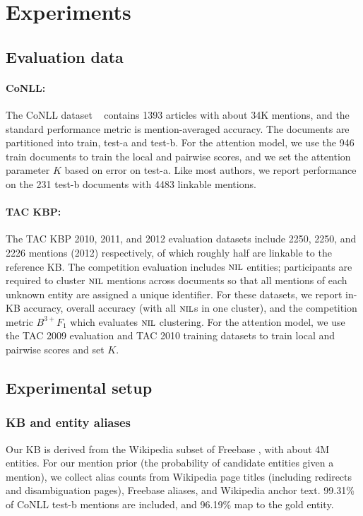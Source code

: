 \section{Experiments}
\label{sec:expt}

\subsection{Evaluation data}

\paragraph*{CoNLL:} 
The CoNLL dataset ~\cite{Hoffart2011} contains 1393 articles with
about 34K mentions, and the standard performance metric is
mention-averaged accuracy.  The documents are partitioned into train,
test-a and test-b.  For the attention model, we use the 946 train documents to train the
local and pairwise scores, and we set the attention parameter $K$ based
on error on test-a.  Like most authors, we report performance on the
231 test-b documents with 4483 linkable mentions.  


\paragraph*{TAC KBP:} 
The TAC KBP 2010, 2011, and 2012 evaluation datasets \cite{TAC2010,TAC2011,TAC2012} include 2250,
2250, and 2226 mentions (2012) respectively,
of which roughly half are linkable
to the reference KB.  The competition evaluation includes $\mbox{\textsc{nil}}$
entities; participants are required to cluster $\mbox{\textsc{nil}}$ mentions across
documents so that all mentions of each unknown entity are assigned a
unique identifier.  For these datasets, we report in-KB accuracy,
overall accuracy (with all $\mbox{\textsc{nil}}$s in one cluster), and the competition
metric $B^{3+} F_1$ which evaluates $\mbox{\textsc{nil}}$ clustering. 
For the attention model, we use the TAC 2009 evaluation and TAC 2010 training datasets to
train local and pairwise scores and set $K$.

\subsection{Experimental setup}

\subsubsection{KB and entity aliases}

Our KB is derived from the Wikipedia subset of Freebase
\cite{BollackerEPST08}, with about 4M entities. For
our mention prior (the probability of candidate entities given a mention), we
collect alias counts from 
Wikipedia page titles (including redirects and disambiguation
pages), Freebase aliases, and Wikipedia anchor text.
99.31\% of CoNLL test-b mentions are included, and 96.19\% map to the gold entity.

